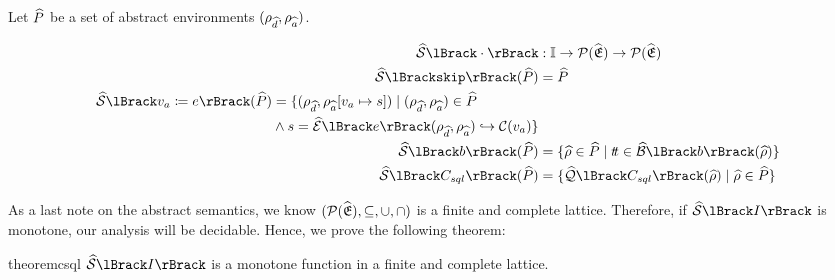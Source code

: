 Let $\widehat{P}$ be a set of abstract environments $(\rho_{\widehat{d}}, \rho_{\widehat{a}})$.

\begin{align} \label{eq:abssemtype}
    \abssem{\cdot} &: \mathbb{I} \rightarrow \mathcal{P}(\ab{\mathfrak{E}}) \rightarrow \mathcal{P}(\ab{\mathfrak{E}}) \\
    \abssem{\texttt{skip}}(\ab{P}) &= \ab{P} \\
    \begin{split}
    \abssem{v_a \coloneqq e}(\ab{P}) &= \{(\env{\ab{d}}, \env{\absvars}[v_a \mapsto s]) \mid (\env{\ab{d}}, \env{\absvars}) \in \ab{P} \\
        & \land s = \absexpsem{e}(\env{\ab{d}}, \env{\absvars}) \into \lookupcl(v_a) \}
    \end{split}\\
    \abssem{b}(\ab{P}) &= \{ \ab{\environment} \in \ab{P} \mid \true \in \absboolsem{b}(\ab{\environment}) \} \\
    \abssem{C_{sql}}(\ab{P}) &= \{\abssqlsem{C_{sql}}(\ab{\environment}) \mid \ab{\environment} \in \ab{P} \}
\end{align}

As a last note on the abstract semantics, we know $(\mathcal{P}(\widehat{\mathfrak{E}}), \subseteq, \cup, \cap)$ is a finite and complete lattice.
Therefore, if $\abssem{I}$ is monotone, our analysis will be decidable.
Hence, we prove the following theorem:

\begin{restatable}{theorem}{csql}\label{thm:csql}
    $\abssem{I}$ is a monotone function in a finite and complete lattice.
\end{restatable}

